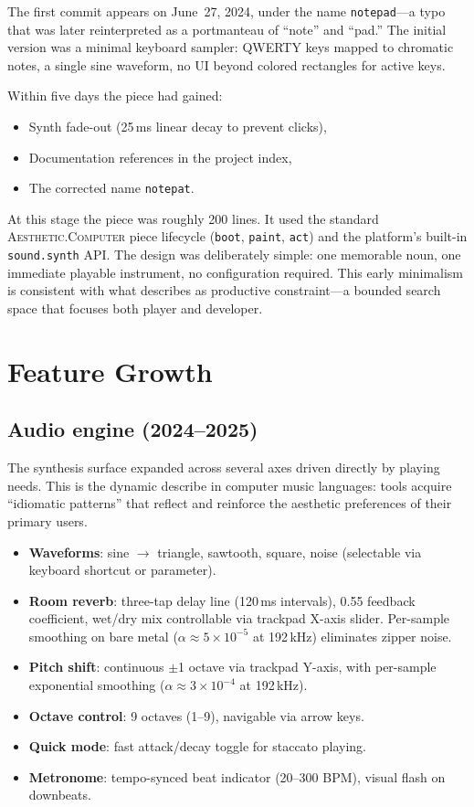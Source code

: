 \documentclass[10pt,letterpaper,twocolumn]{article}
\newcommand{\ac}{\textsc{Aesthetic.Computer}}
\begin{document}
The first commit appears on June~27, 2024, under the name \texttt{notepad}---a typo that was later reinterpreted as a portmanteau of ``note'' and ``pad.'' The initial version was a minimal keyboard sampler: QWERTY keys mapped to chromatic notes, a single sine waveform, no UI beyond colored rectangles for active keys.

Within five days the piece had gained:
\begin{itemize}
  \item Synth fade-out (25\,ms linear decay to prevent clicks),
  \item Documentation references in the project index,
  \item The corrected name \texttt{notepat}.
\end{itemize}

At this stage the piece was roughly 200 lines. It used the standard \ac{} piece lifecycle (\texttt{boot}, \texttt{paint}, \texttt{act}) and the platform's built-in \texttt{sound.synth} API. The design was deliberately simple: one memorable noun, one immediate playable instrument, no configuration required. This early minimalism is consistent with what \citet{magnusson2010designing} describes as productive constraint---a bounded search space that focuses both player and developer.

\section{Feature Growth}

\subsection{Audio engine (2024--2025)}

The synthesis surface expanded across several axes driven directly by playing needs. This is the dynamic \citet{mcpherson2020idiomatic} describe in computer music languages: tools acquire ``idiomatic patterns'' that reflect and reinforce the aesthetic preferences of their primary users.

\begin{itemize}
  \item \textbf{Waveforms}: sine $\rightarrow$ triangle, sawtooth, square, noise (selectable via keyboard shortcut or parameter).
  \item \textbf{Room reverb}: three-tap delay line (120\,ms intervals), 0.55 feedback coefficient, wet/dry mix controllable via trackpad X-axis slider. Per-sample smoothing on bare metal ($\alpha \approx 5 \times 10^{-5}$ at 192\,kHz) eliminates zipper noise.
  \item \textbf{Pitch shift}: continuous $\pm$1 octave via trackpad Y-axis, with per-sample exponential smoothing ($\alpha \approx 3 \times 10^{-4}$ at 192\,kHz).
  \item \textbf{Octave control}: 9 octaves (1--9), navigable via arrow keys.
  \item \textbf{Quick mode}: fast attack/decay toggle for staccato playing.
  \item \textbf{Metronome}: tempo-synced beat indicator (20--300 BPM), visual flash on downbeats.
\end{itemize}
\end{document}
